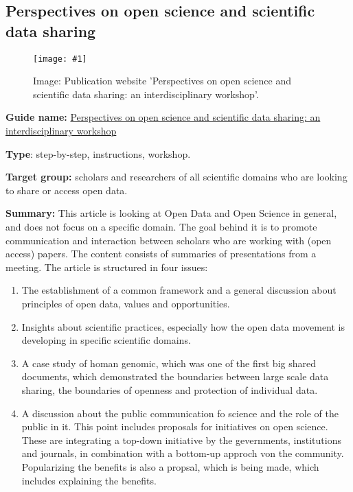\documentclass{article}
\newlength{\imgwidth}
\newcommand\scaledgraphics[2]{%
                
\settowidth{\imgwidth}{\texttt{[image: \#1]}}%
                
\setlength{\imgwidth}{\minof{\imgwidth}{#2\textwidth}}%
                
\texttt{[image: \#1]}%
                
}
\begin{document}
\subsection{Perspectives on open science and scientific data sharing}\label{H5120034}



\begin{center}
\begin{figure}
\scaledgraphics{6ab89e0c-e542-4afd-b586-eabe59773bc0.jpg}{0.5}
\caption*{Image: Publication website 'Perspectives on open science and scientific data sharing: an interdisciplinary workshop'.}\label{F43484161}
\end{figure}


\end{center}


\textbf{Guide name:} \href{https://papers.ssrn.com/sol3/papers.cfm?abstract_id=2456712&download=yes}{Perspectives on open science and scientific data sharing: an interdisciplinary workshop} \autocite{destro_bisol_perspectives_2014}


\textbf{Type}: step-by-step, instructions, workshop.


\textbf{Target group:} scholars and researchers of all scientific domains who are looking to share or access open data.


\textbf{Summary:} This article is looking at Open Data and Open Science in general, and does not focus on a specific domain. The goal behind it is to promote communication and interaction between scholars who are working with (open access) papers. The content consists of summaries of presentations from a meeting. The article is structured in four issues:

\begin{enumerate}
\item The establishment of a common framework and a general discussion about principles of open data, values and opportunities.


\item Insights about scientific practices, especially how the open data movement is developing in specific scientific domains.


\item A case study of homan genomic, which was one of the first big shared documents, which demonstrated the boundaries between large scale data sharing, the boundaries of openness and protection of individual data.


\item A discussion about the public communication fo science and the role of the public in it. This point includes proposals for initiatives on open science. These are integrating a top-down initiative by the gevernments, institutions and journals, in combination with a bottom-up approch von the community. Popularizing the benefits is also a propsal, which is being made, which includes explaining the benefits.


\end{enumerate}
\end{document}
